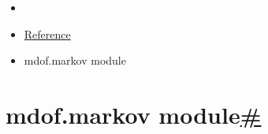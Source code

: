 \hypertarget{rtd-footer-container}{}

\hypertarget{main-content}{}
\begin{itemize}
\tightlist
\item
  \href{../index.html}{\emph{}}
\item
  \href{index.html}{Reference}
\item
  mdof.markov module
\end{itemize}

\hypertarget{searchbox}{}

\hypertarget{module-mdof.markov}{}
\protect\hypertarget{mdof-markov-module}{}{}

\hypertarget{mdof.markov-module}{%
\section{\texorpdfstring{mdof.markov
module\protect\hyperlink{module-mdof.markov}{\#}}{mdof.markov module\#}}\label{mdof.markov-module}}

